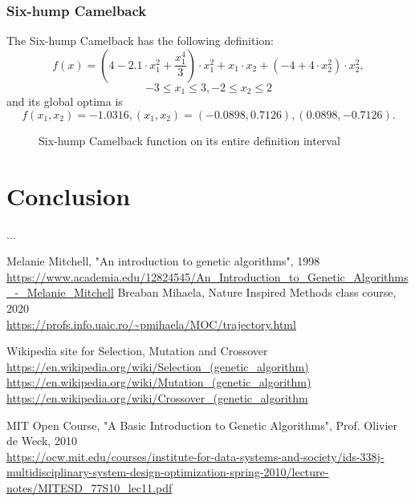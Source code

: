 \documentclass{article}
\begin{document}
\subsubsection{Six-hump Camelback}
The Six-hump Camelback has the following definition:
$$f(x) = \left(4 - 2.1 \cdot x_1^2 + \frac{x_1^4}{3}\right) \cdot x_1 ^2 + x_1 \cdot x_2 + \left(-4 + 4 \cdot x_2^2\right) \cdot x_2^2,$$ $$-3 \leq x_1 \leq 3, -2 \leq x_2 \leq 2$$
and its global optima is $$f(x_1, x_2) = -1.0316, (x_1, x_2) = (-0.0898,0.7126), (0.0898,-0.7126).$$
\begin{figure}[h!]
  \centering
  
  \caption{Six-hump Camelback function on its entire definition interval}
\end{figure}

\section{Conclusion}
...


\begin{thebibliography}{9}
\bibitem{} 
Melanie Mitchell, "An introduction to genetic algorithms", 1998
\\\url{https://www.academia.edu/12824545/An_Introduction_to_Genetic_Algorithms_-_Melanie_Mitchell}
\bibitem{} 
Breaban Mihaela, Nature Inspired Methods class course, 2020
\\\url{https://profs.info.uaic.ro/~pmihaela/MOC/trajectory.html}

\bibitem{} 
Wikipedia site for Selection, Mutation and Crossover
\\\url{https://en.wikipedia.org/wiki/Selection_(genetic_algorithm)}
\\\url{https://en.wikipedia.org/wiki/Mutation_(genetic_algorithm)}
\\\url{https://en.wikipedia.org/wiki/Crossover_(genetic_algorithm}

\bibitem{}
MIT Open Course, "A Basic Introduction to Genetic Algorithms", Prof. Olivier de Weck, 2010
\\\url{https://ocw.mit.edu/courses/institute-for-data-systems-and-society/ids-338j-multidisciplinary-system-design-optimization-spring-2010/lecture-notes/MITESD_77S10_lec11.pdf}
\end{thebibliography}
\end{document}
